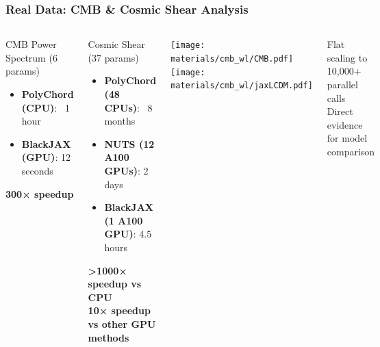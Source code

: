 \documentclass[aspectratio=169]{beamer}
\begin{document}
\begin{frame}
    \frametitle{Real Data: CMB \& Cosmic Shear Analysis}
    \begin{columns}
        \begin{block}{CMB Power Spectrum (6 params)}
            \begin{itemize}
                \item \textbf{PolyChord (CPU)}: ~1 hour
                \item \textbf{BlackJAX (GPU)}: 12 seconds
            \end{itemize}
            \vspace{5pt}
            \begin{center}
                \textbf{300× speedup}
            \end{center}
        \end{block}
        \begin{block}{Cosmic Shear (37 params)}
            \begin{itemize}
                \item \textbf{PolyChord (48 CPUs)}: ~8 months
                \item \textbf{NUTS (12 A100 GPUs)}: 2 days
                \item \textbf{BlackJAX (1 A100 GPU)}: 4.5 hours
            \end{itemize}
            \vspace{5pt}
            \begin{center}
                \textbf{>1000× speedup vs CPU}\\
                \textbf{10× speedup vs other GPU methods}
            \end{center}
        \end{block}
        \texttt{[image: materials/cmb\_wl/CMB.pdf]}
        \texttt{[image: materials/cmb\_wl/jaxLCDM.pdf]}
        \vspace{5pt}
        \begin{center}
            \small{Flat scaling to 10,000+ parallel calls\\
            Direct evidence for model comparison}
        \end{center}
    \end{columns}
\end{frame}
\end{document}

